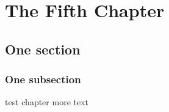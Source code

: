 \documentclass[../main.tex]{subfiles}
\begin{document}
\chapter{The Fifth Chapter}

\lipsum[7]

\section{One section}

\lipsum[3]

\subsection{One subsection}

\lipsum[3]
test chapter more text
\end{document}
